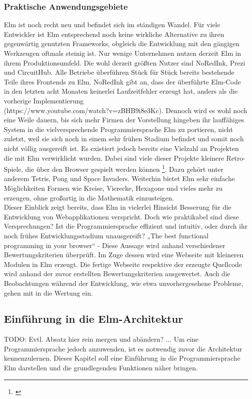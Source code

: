 \subsubsection{Praktische Anwendungsgebiete}
\label{sec:Praktische Anwendungsgebiete}
Elm ist noch recht neu und befindet sich im ständigen Wandel. Für viele Entwickler ist Elm entsprechend noch keine wirkliche Alternative zu ihren gegenwärtig genutzten Frameworks, obgleich die Entwicklung mit den gängigen Werkzeugen oftmals steinig ist. Nur wenige Unternehmen nutzen derzeit Elm in ihrem Produktionsumfeld. Die wohl derzeit größten Nutzer sind NoRedInk, Prezi und CircuitHub. Alle Betriebe überführen Stück für Stück bereits bestehende Teile ihres Frontends zu Elm. NoRedInk gibt an, dass der überführte Elm-Code in den letzten acht Monaten keinerlei Laufzeitfehler erzeugt hat, anders als die vorherige Implementierung\\ (https://www.youtube.com/watch?v=zBHB9i8e3Kc). Dennoch wird es wohl noch eine Weile dauern, bis sich mehr Firmen der Vorstellung hingeben ihr lauffähiges System in die vielversprechende Programmiersprache Elm zu portieren, nicht zuletzt, weil sie sich noch in einem sehr frühen Stadium befindet und somit noch nicht völlig ausgereift ist.
Es existiert jedoch bereits eine Vielzahl an Projekten die mit Elm verwirklicht wurden. Dabei sind viele dieser Projekte kleinere Retro-Spiele, die über den Browser gespielt werden können \footnote{\cite[vgl.]{builtwithelm}}. Dazu gehört unter anderem Tetris, Pong und Space Invaders. Weiterhin bietet Elm sehr einfache Möglichkeiten Formen wie Kreise, Vierecke, Hexagone und vieles mehr zu erzeugen, ohne großartig in die Mathematik einzusteigen.\\
Dieser Einblick zeigt bereits, dass Elm in vielerlei Hinsicht Besserung für die Entwicklung von Webapplikationen verspricht. Doch wie praktikabel sind diese Versprechungen? Ist die Programmiersprache effizient und intuitiv, oder durch ihr noch frühes Entwicklungsstadium unausgereift?
„The best functional programming in your browser“ - Diese Aussage wird anhand verschiedener Bewertungskriterien überprüft.
Im Zuge dessen wird eine Webseite mit kleineren Modulen in Elm erzeugt. Die fertige Webseite respektive der erzeugte Quellcode wird anhand der zuvor erstellten Bewertungskriterien ausgewertet. Auch die Beobachtungen während der Entwicklung, wie etwa unvorhergesehene Probleme, gehen mit in die Wertung ein.

\subsection{Einführung in die Elm-Architektur}
\label{sec:elm-architektur}
TODO: Evtl. Absatz  hier rein mergen und abändern?
... Um eine Programmiersprache jedoch anzuwenden, ist es notwendig zuvor die Architektur kennenzulernen. Dieses Kapitel soll eine Einführung in die Programmiersprache Elm darstellen und die grundlegenden Funktionen näher bringen.


